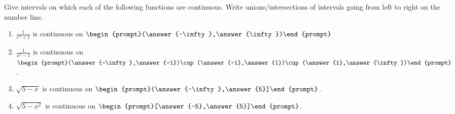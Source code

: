 \documentclass{ximera}
\author{Gregory Hartman \and Matthew Carr}
\begin{document}
\begin{exercise}




Give intervals on which each of the following functions are continuous. Write unions/intersections of intervals going from left to right on the number line.

\begin{enumerate}
\item		$\frac{1}{e^x+1}$ is continuous on $\begin{prompt}(\answer{-\infty},\answer{\infty})\end{prompt}$
\item		$\frac{1}{x^2-1}$ is continuous on $\begin{prompt}(\answer{-\infty},\answer{-1})\cup(\answer{-1},\answer{1})\cup(\answer{1},\answer{\infty})\end{prompt}$.
\item		$\sqrt{5-x}$ is continuous on $\begin{prompt}(\answer{-\infty},\answer{5}]\end{prompt}$.
\item		$\sqrt{5-x^2}$ is continuous on $\begin{prompt}[\answer{-5},\answer{5}]\end{prompt}$.
\end{enumerate}

\end{exercise}
\end{document}
